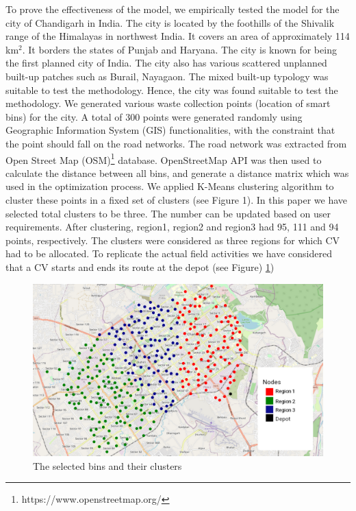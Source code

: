 \documentclass[12pt]{article}
\begin{document}
To prove the effectiveness of the model, we empirically tested the model for the city of Chandigarh in India. The city is located by the foothills of the Shivalik range of the Himalayas in northwest India. It covers an area of approximately 114 km$^2$. It borders the states of Punjab and Haryana. The city is known for being the first planned city of India. The city also has various scattered unplanned built-up patches such as Burail, Nayagaon. The mixed built-up typology was suitable to test the methodology. Hence, the city was found suitable to test the methodology. We generated various waste collection points (location of smart bins) for the city. A total of 300 points were generated randomly using Geographic Information System (GIS) functionalities, with the constraint that the point should fall on the road networks. The road network was extracted from Open Street Map (OSM)\footnote{https://www.openstreetmap.org/} database. OpenStreetMap API was then used to calculate the distance between all bins, and generate a distance matrix which was used in the optimization process. We applied K-Means clustering algorithm to cluster these points in a fixed set of clusters (see Figure 1). In this paper we have selected total clusters to be three. The number can be updated based on user requirements. After clustering, region1, region2 and region3 had 95, 111 and 94 points, respectively. The clusters were considered as three regions for which CV had to be allocated. To replicate the actual field activities we have considered that a CV starts and ends its route at the depot (see Figure) \ref{figm})


\begin{figure}[H]
    \centering
    \includegraphics[scale=0.4]{Nodes.png}
    \caption{The selected bins and their clusters}\label{figm}
\end{figure}
\end{document}
